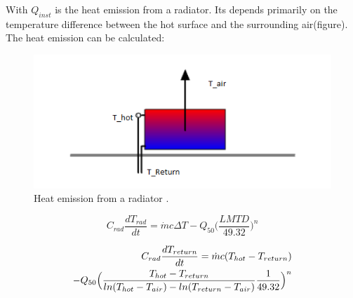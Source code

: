 With $Q_{inst}$ is the heat emission from a radiator. Its depends primarily on the temperature difference between the hot surface and the surrounding air(figure). The heat emission can be calculated: \cite{Radiators}

\begin{figure}[ht]
\centering
\includegraphics[width=1\columnwidth]{pictures/heat_emission_radiator.png}
\caption[Short title]{Heat emission from a radiator \cite{Radiators}.}
\label{fig:radiator}
\end{figure}

\begin{equation}
C_{rad}\frac{dT_{rad}}{dt} = \Dot{m}c\Delta T - Q_{50}\Big(\frac{LMTD}{49.32}\Big)^n
\end{equation}


\begin{align}
C_{rad}\frac{dT_{return}}{dt} = \Dot{m}c(T_{hot}-T_{return})\notag\\
- Q_{50}\Big(\frac{T_{hot}-T_{return}}{ln(T_{hot}-T_{air}) - ln(T_{return}-T_{air})}\frac{1}{49.32}\Big)^n
\end{align}






